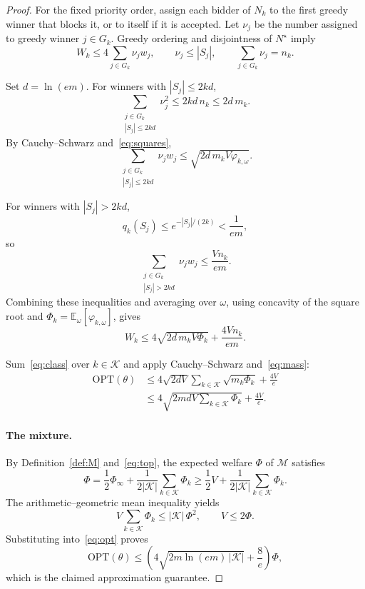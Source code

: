\documentclass[format=acmsmall, review=false]{acmart}
\newcommand{\E}{\mathbb{E}}
\newcommand{\OPT}{\mathrm{OPT}}
\begin{document}
\begin{proof}
For the fixed priority order, assign each bidder of \(N_k\) to
the first greedy winner that blocks it, or to itself if it is
accepted. Let \(\nu_j\) be the number assigned to greedy winner
\(j\in G_k\). Greedy ordering and disjointness of \(N^\star\)
imply
\[
W_k\le4\sum_{j\in G_k}\nu_jw_j,\qquad
\nu_j\le|S_j|,\qquad
\sum_{j\in G_k}\nu_j=n_k.
\]

Set \(d=\ln(em)\). For winners with \(|S_j|\le2kd\),
\[
\sum_{\substack{j\in G_k\\|S_j|\le2kd}}\nu_j^2
\le 2kd\,n_k
\le 2d\,m_k.
\]
By Cauchy--Schwarz and~\eqref{eq:squares},
\[
\sum_{\substack{j\in G_k\\|S_j|\le2kd}}\nu_jw_j
\le
\sqrt{2d\,m_kV\varphi_{k,\omega}}.
\]

For winners with \(|S_j|>2kd\),
\[
q_k(S_j)
\le
e^{-|S_j|/(2k)}
<
\frac1{em},
\]
so
\[
\sum_{\substack{j\in G_k\\|S_j|>2kd}}\nu_jw_j
\le
\frac{Vn_k}{em}.
\]
Combining these inequalities and averaging over \(\omega\),
using concavity of the square root and
\(\Phi_k=\E_\omega[\varphi_{k,\omega}]\), gives
\begin{equation}\label{eq:class}
W_k
\le
4\sqrt{2d\,m_kV\Phi_k}
+
\frac{4Vn_k}{em}.
\end{equation}

Sum~\eqref{eq:class} over \(k\in\mathcal K\) and apply
Cauchy--Schwarz and~\eqref{eq:mass}:
\begin{equation}\label{eq:opt}
\begin{aligned}
\OPT(\theta)
&\le
4\sqrt{2dV}\sum_{k\in\mathcal K}\sqrt{m_k\Phi_k}
+\frac{4V}{e}\\
&\le
4\sqrt{2mdV\sum_{k\in\mathcal K}\Phi_k}
+\frac{4V}{e}.
\end{aligned}
\end{equation}

\paragraph{The mixture.}
By Definition~\ref{def:M} and~\eqref{eq:top}, the expected
welfare \(\Phi\) of \(\mathcal M\) satisfies
\[
\Phi
=\frac12\Phi_\infty
+\frac1{2|\mathcal K|}\sum_{k\in\mathcal K}\Phi_k
\ge\frac12V
+\frac1{2|\mathcal K|}\sum_{k\in\mathcal K}\Phi_k.
\]
The arithmetic--geometric mean inequality yields
\[
V\sum_{k\in\mathcal K}\Phi_k\le|\mathcal K|\,\Phi^2,
\qquad
V\le2\Phi.
\]
Substituting into~\eqref{eq:opt} proves
\[
\OPT(\theta)
\le
\left(
4\sqrt{2m\ln(em)\,|\mathcal K|}+\frac8e
\right)\Phi,
\]
which is the claimed approximation guarantee.
\end{proof}
\end{document}
